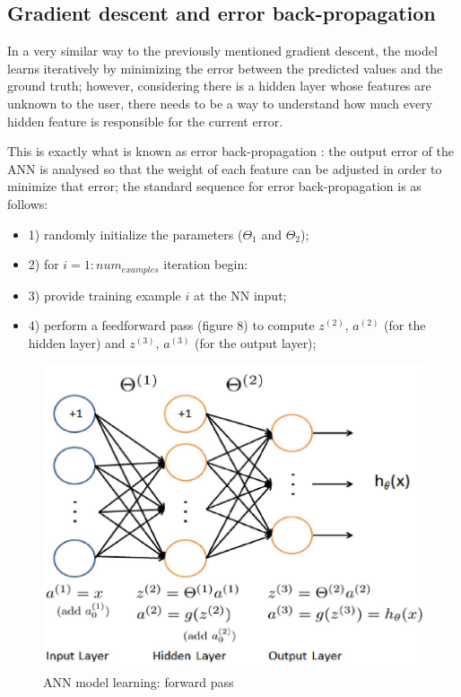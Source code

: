 \documentclass[conference]{IEEEtran}
\begin{document}
\subsection{Gradient descent and error back-propagation}
In a very similar way to the previously mentioned gradient descent, the model learns iteratively by minimizing the error between the predicted values and the ground truth; however, considering there is a hidden layer whose features are unknown to the user, there needs to be a way to understand how much every hidden feature is responsible for the current error.
\par This is exactly what is known as error back-propagation \cite{b4}: the output error of the ANN is analysed so that the weight of each feature can be adjusted in order to minimize that error; the standard sequence for error back-propagation is as follows:


\begin{itemize}
    \item 1) randomly initialize the parameters ($\Theta_1$ and $\Theta_2$);
    \item 2) for $i = 1:num_{examples}$ iteration begin:
    \item 3) provide training example $i$ at the NN input;
    \item 4) perform a feedforward pass (figure 8) to compute $z^{(2)}$, $a^{(2)}$ (for the hidden layer) and
$z^{(3)}$, $a^{(3)}$ (for the output layer);

\end{itemize}

\begin{figure}[H]
\centering
\includegraphics[scale=0.4]{ann_eq_n.png}
\caption{ANN model learning: forward pass}
\label{fig8}
\end{figure}
\end{document}
